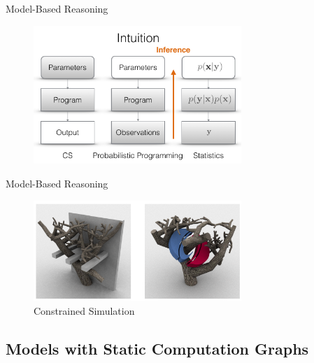 \documentclass[AERbeamer%
              ,optEnglish%
              ,optBiber%
              ,optBibstyleAlphabetic%
              ,optBeamerClassicFormat%
              ]{AERlatex}%
\begin{document}
\begin{frame}[c]{Model-Based Reasoning}
    \centering
    \begin{figure}
        \centering
        \includegraphics[width=0.7\textwidth]{ProbProgIntuition.png}
    \end{figure}
\end{frame}


\begin{frame}[c]{Model-Based Reasoning}
    \centering
    \begin{figure}
        \centering
        \includegraphics[width=0.7\textwidth]{ConstrainedSimulation.png}
        \caption{Constrained Simulation}
    \end{figure}
\end{frame}



\subsection{Models with Static Computation Graphs}
\end{document}

